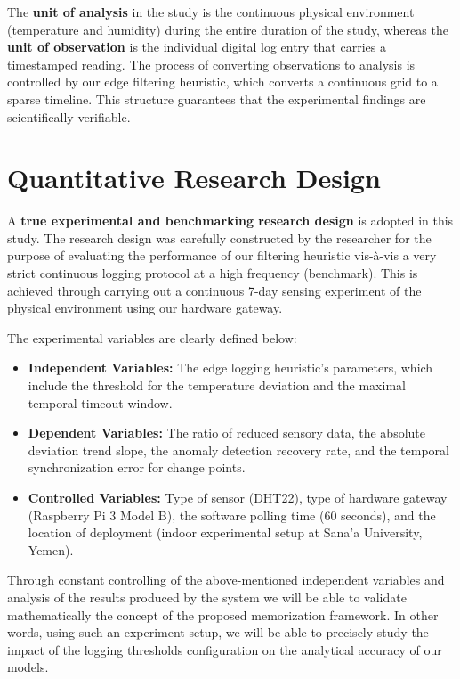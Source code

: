 The \textbf{unit of analysis} in the study is the continuous physical environment (temperature and humidity) during the entire duration of the study, whereas the \textbf{unit of observation} is the individual digital log entry that carries a timestamped reading. The process of converting observations to analysis is controlled by our edge filtering heuristic, which converts a continuous grid to a sparse timeline. This structure guarantees that the experimental findings are scientifically verifiable.

\section{Quantitative Research Design}
\label{sec:design}
A \textbf{true experimental and benchmarking research design} is adopted in this study. The research design was carefully constructed by the researcher for the purpose of evaluating the performance of our filtering heuristic vis-à-vis a very strict continuous logging protocol at a high frequency (benchmark). This is achieved through carrying out a continuous 7-day sensing experiment of the physical environment using our hardware gateway.

The experimental variables are clearly defined below:
\begin{itemize}
 \item \textbf{Independent Variables:} The edge logging heuristic’s parameters, which include the threshold for the temperature deviation and the maximal temporal timeout window.
    \item \textbf{Dependent Variables:} The ratio of reduced sensory data, the absolute deviation trend slope, the anomaly detection recovery rate, and the temporal synchronization error for change points.
    \item \textbf{Controlled Variables:} Type of sensor (DHT22), type of hardware gateway (Raspberry Pi 3 Model B), the software polling time (60 seconds), and the location of deployment (indoor experimental setup at Sana'a University, Yemen).
\end{itemize}

Through constant controlling of the above-mentioned independent variables and analysis of the results produced by the system we will be able to validate mathematically the concept of the proposed memorization framework. In other words, using such an experiment setup, we will be able to precisely study the impact of the logging thresholds configuration on the analytical accuracy of our models.

